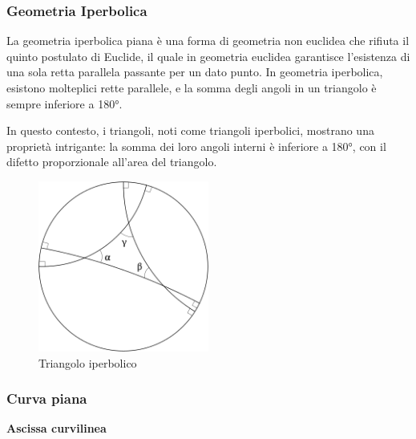 \subsubsection{Geometria Iperbolica}

La geometria iperbolica piana è una forma di geometria non euclidea che rifiuta il quinto postulato di Euclide, il quale in geometria euclidea garantisce l'esistenza di una sola retta parallela passante per un dato punto. In geometria iperbolica, esistono molteplici rette parallele, e la somma degli angoli in un triangolo è sempre inferiore a 180°.


In questo contesto, i triangoli, noti come triangoli iperbolici, mostrano una proprietà intrigante: la somma dei loro angoli interni è inferiore a 180°, con il difetto proporzionale all'area del triangolo.

\begin{figure}[H]
    \centering
    \includegraphics[width=0.5\textwidth]{assets/hyperbolic_triangle.png}
    \caption{Triangolo iperbolico}
\end{figure}

\subsubsection{Curva piana}

\textbf{Ascissa curvilinea}

